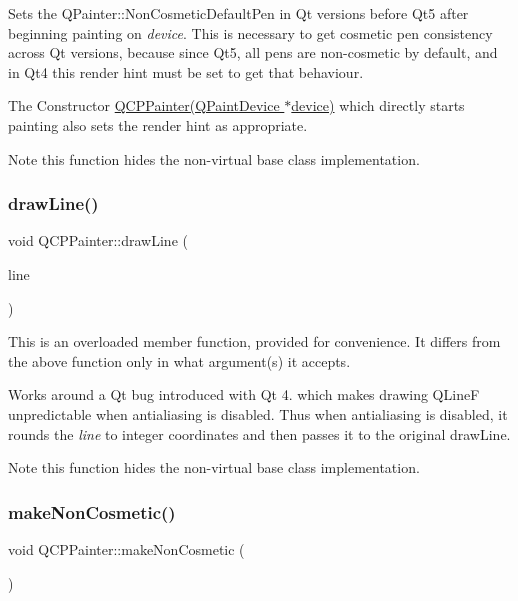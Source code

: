 Sets the Q\+Painter\+::\+Non\+Cosmetic\+Default\+Pen in Qt versions before Qt5 after beginning painting on {\itshape device}. This is necessary to get cosmetic pen consistency across Qt versions, because since Qt5, all pens are non-\/cosmetic by default, and in Qt4 this render hint must be set to get that behaviour.

The Constructor \hyperlink{class_q_c_p_painter_ae58dbb1795ddc4351ab324dc9898aa22}{Q\+C\+P\+Painter(\+Q\+Paint\+Device $\ast$device)} which directly starts painting also sets the render hint as appropriate.

\begin{DoxyNote}{Note}
this function hides the non-\/virtual base class implementation. 
\end{DoxyNote}
\mbox{\label{class_q_c_p_painter_a0b4b1b9bd495e182c731774dc800e6e0}} 
\subsubsection{\texorpdfstring{draw\+Line()}{drawLine()}}
{\footnotesize\ttfamily void Q\+C\+P\+Painter\+::draw\+Line (\begin{DoxyParamCaption}\item[{const Q\+LineF \&}]{line }\end{DoxyParamCaption})}

This is an overloaded member function, provided for convenience. It differs from the above function only in what argument(s) it accepts.

Works around a Qt bug introduced with Qt 4. which makes drawing Q\+LineF unpredictable when antialiasing is disabled. Thus when antialiasing is disabled, it rounds the {\itshape line} to integer coordinates and then passes it to the original draw\+Line.

\begin{DoxyNote}{Note}
this function hides the non-\/virtual base class implementation. 
\end{DoxyNote}
\mbox{\label{class_q_c_p_painter_a7e63fbcf47e35c6f2ecd11b8fef7c7d8}} 
\subsubsection{\texorpdfstring{make\+Non\+Cosmetic()}{makeNonCosmetic()}}
{\footnotesize\ttfamily void Q\+C\+P\+Painter\+::make\+Non\+Cosmetic (\begin{DoxyParamCaption}{ }\end{DoxyParamCaption})}

